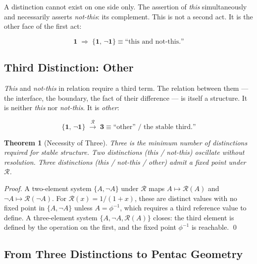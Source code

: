 \documentclass[11pt]{article}
\newtheorem{theorem}{Theorem}
\begin{document}
A distinction cannot exist on one side only. The assertion of
\emph{this} simultaneously and necessarily asserts \emph{not-this}:
its complement. This is not a second act. It is the other face of
the first act:

\begin{equation}
  \mathbf{1} \;\Longrightarrow\; \{\mathbf{1},\, \neg\mathbf{1}\}
  \equiv \text{``this and not-this.''}
\end{equation}

\subsection{Third Distinction: Other}

\emph{This} and \emph{not-this} in relation require a third term.
The relation between them --- the interface, the boundary, the fact
of their difference --- is itself a structure. It is neither
\emph{this} nor \emph{not-this}. It is \emph{other}:

\begin{equation}
  \{\mathbf{1},\,\neg\mathbf{1}\}
  \;\xrightarrow{\mathcal{R}}\;
  \mathbf{3} \equiv \text{``other'' / the stable third.''}
\end{equation}

\begin{theorem}[Necessity of Three]
  Three is the minimum number of distinctions required for stable
  structure. Two distinctions (this / not-this) oscillate without
  resolution. Three distinctions (this / not-this / other) admit a
  fixed point under $\mathcal{R}$.
\end{theorem}

\begin{proof}
  A two-element system $\{A, \neg A\}$ under $\mathcal{R}$ maps
  $A\mapsto \mathcal{R}(A)$ and $\neg A\mapsto \mathcal{R}(\neg A)$.
  For $\mathcal{R}(x)=1/(1+x)$, these are distinct values with no
  fixed point in $\{A,\neg A\}$ unless $A=\phi^{-1}$, which requires
  a third reference value to define. A three-element system
  $\{A,\neg A, \mathcal{R}(A)\}$ closes: the third element is
  defined by the operation on the first, and the fixed point
  $\phi^{-1}$ is reachable. \qed
\end{proof}

\subsection{From Three Distinctions to Pentac Geometry}
\end{document}
